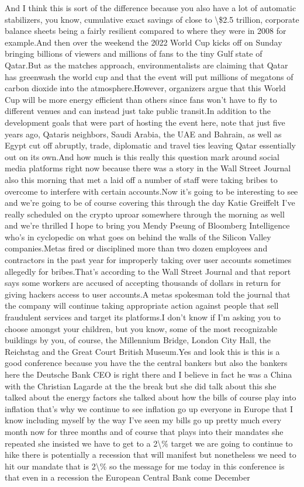 \documentclass{article}%
\begin{document}
And I think this is sort of the difference because you also have a lot of automatic stabilizers, you know, cumulative exact savings of close to \textbackslash{}\$2.5 trillion, corporate balance sheets being a fairly resilient compared to where they were in 2008 for example.And then over the weekend the 2022 World Cup kicks off on Sunday bringing billions of viewers and millions of fans to the tiny Gulf state of Qatar.But as the matches approach, environmentalists are claiming that Qatar has greenwash the world cup and that the event will put millions of megatons of carbon dioxide into the atmosphere.However, organizers argue that this World Cup will be more energy efficient than others since fans won't have to fly to different venues and can instead just take public transit.In addition to the development goals that were part of hosting the event here, note that just five years ago, Qataris neighbors, Saudi Arabia, the UAE and Bahrain, as well as Egypt cut off abruptly, trade, diplomatic and travel ties leaving Qatar essentially out on its own.And how much is this really this question mark around social media platforms right now because there was a story in the Wall Street Journal also this morning that met a laid off a number of staff were taking bribes to overcome to interfere with certain accounts.Now it's going to be interesting to see and we're going to be of course covering this through the day Katie Greiffelt I've really scheduled on the crypto uproar somewhere through the morning as well and we're thrilled I hope to bring you Mendy Pseung of Bloomberg Intelligence who's in cyclopedic on what goes on behind the walls of the Silicon Valley companies.Metas fired or disciplined more than two dozen employees and contractors in the past year for improperly taking over user accounts sometimes allegedly for bribes.That's according to the Wall Street Journal and that report says some workers are accused of accepting thousands of dollars in return for giving hackers access to user accounts.A metas spokesman told the journal that the company will continue taking appropriate action against people that sell fraudulent services and target its platforms.I don't know if I'm asking you to choose amongst your children, but you know, some of the most recognizable buildings by you, of course, the Millennium Bridge, London City Hall, the Reichstag and the Great Court British Museum.Yes and look this is this is a good conference because you have the the central bankers but also the bankers here the Deutsche Bank CEO is right there and I believe in fact he was a China with the Christian Lagarde at the the break but she did talk about this she talked about the energy factors she talked about how the bills of course play into inflation that's why we continue to see inflation go up everyone in Europe that I know including myself by the way I've seen my bills go up pretty much every month now for three months and of course that plays into their mandates she repeated she insisted we have to get to a 2\textbackslash{}\% target we are going to continue to hike there is potentially a recession that will manifest but nonetheless we need to hit our mandate that is 2\textbackslash{}\% so the message for me today in this conference is that even in a recession the European Central Bank come December 
\end{document}
